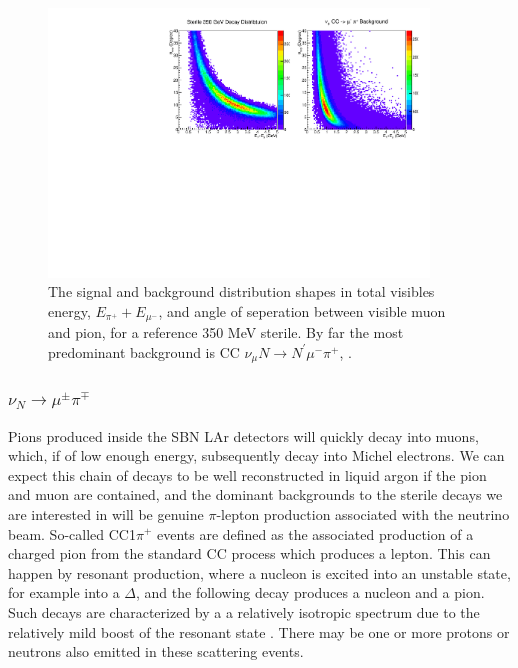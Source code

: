 \documentclass[11pt, a4paper]{article}
\begin{document}
\begin{figure}[h]
\center
\includegraphics[width=0.9\textwidth,clip,trim=0 0 0 0]{figures/mu_pi_dist.pdf}
\caption{\label{fig:mu_pi_dist} The signal and background distribution shapes in total visibles energy,  $E_{\pi^+}+E_{\mu^-}$, and angle of seperation between visible muon and pion, for a reference 350 MeV sterile. By far the most predominant background is CC $\nu_\mu N \rightarrow N^\prime \mu^- \pi^+$, . }

\end{figure}
\subsubsection{$\nu_N \rightarrow \mu^\pm \pi^\mp$ }

Pions produced inside the SBN LAr detectors will quickly decay into muons,
which, if of low enough energy, subsequently decay into Michel electrons. We
can expect this chain of decays to be well reconstructed in liquid argon if the
pion and muon are contained, and the dominant backgrounds to the sterile decays
we are interested in will be genuine $\pi$-lepton production associated with
the neutrino beam. So-called CC1$\pi^+$ events are defined as the associated
production of a charged pion from the standard CC process which produces a
lepton. This can happen by resonant production, where a nucleon is excited into
an unstable state, for example into a $\Delta$, and the following decay
produces a nucleon and a pion. Such decays are characterized by a a relatively
isotropic spectrum due to the relatively mild boost of the resonant state
\cite{Rein:1982pf}. There may be one or more protons or neutrons also emitted
in these scattering events. 
\end{document}

